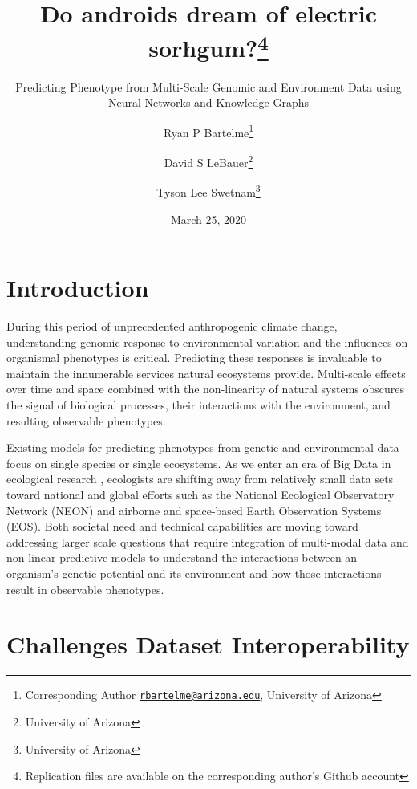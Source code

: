 \documentclass[12pt,]{article}
\title{Do androids dream of electric sorhgum?\thanks{Replication files are available on the corresponding author's Github
account}}
\subtitle{Predicting Phenotype from Multi-Scale Genomic and Environment Data using
Neural Networks and Knowledge Graphs}
\author{Ryan P Bartelme\footnote{Corresponding Author
  \href{mailto:rbartelme@arizona.edu}{\nolinkurl{rbartelme@arizona.edu}},
  University of Arizona} \and David S LeBauer\footnote{University of Arizona} \and Tyson Lee Swetnam\footnote{University of Arizona}}
\date{March 25, 2020}
\begin{document}
\maketitle

\hypertarget{introduction}{%
\section{Introduction}\label{introduction}}

During this period of unprecedented anthropogenic climate change,
understanding genomic response to environmental variation and the
influences on organismal phenotypes is critical. Predicting these
responses is invaluable to maintain the innumerable services natural
ecosystems provide. Multi-scale effects over time and space combined
with the non-linearity of natural systems
\citep{lorenz1963deterministic, ruel1999jensen, west2009general}
obscures the signal of biological processes, their interactions with the
environment, and resulting observable phenotypes.

Existing models for predicting phenotypes from genetic and environmental
data focus on single species or single ecosystems. As we enter an era of
Big Data in ecological research \citep{balch2020neon}, ecologists are
shifting away from relatively small data sets toward national and global
efforts such as the National Ecological Observatory Network (NEON)
\citep{keller2008continental} and airborne and space-based Earth
Observation Systems (EOS). Both societal need and technical capabilities
are moving toward addressing larger scale questions that require
integration of multi-modal data and non-linear predictive models to
understand the interactions between an organism's genetic potential and
its environment and how those interactions result in observable
phenotypes.

\hypertarget{challenges-dataset-interoperability}{%
\section{Challenges Dataset
Interoperability}\label{challenges-dataset-interoperability}}
\end{document}
